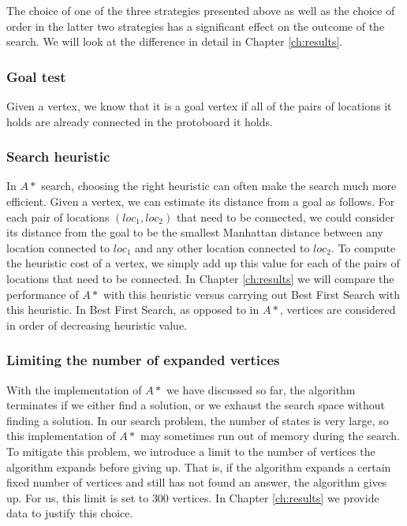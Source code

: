 The choice of one of the three strategies presented above as well as the choice
of order in the latter two strategies has a significant effect on the outcome of
the search. We will look at the difference in detail in Chapter \ref{ch:results}.

\subsubsection{Goal test}

Given a vertex, we know that it is a goal vertex if all of the pairs of
locations it holds are already connected in the protoboard it holds.

\subsubsection{Search heuristic}

In $A*$ search, choosing the right heuristic can often make the search much more
efficient. Given a
vertex, we can estimate its distance from a goal as follows. For each pair of
locations $(loc_1, loc_2)$ that need to be connected, we could consider its
distance from the
goal to be the smallest Manhattan distance between any location connected to
$loc_1$ and any other location connected to $loc_2$. To compute the heuristic
cost of a vertex, we simply add up this value for each of the pairs of locations
that need to be connected. In Chapter \ref{ch:results} we will compare the
performance of $A*$ with this heuristic versus carrying out Best First Search
with this heuristic. In Best First Search, as opposed to in $A*$, vertices are
considered in order of decreasing heuristic value.

\subsubsection{Limiting the number of expanded vertices}

With the implementation of $A*$ we have discussed so far, the algorithm
terminates if we either find a solution, or we
exhaust the search space without finding a solution. In our search problem, the
number of states is very large, so this implementation of $A*$ may sometimes
run out
of memory during the search. To mitigate this problem, we introduce a limit to
the number of vertices the algorithm expands before giving up. That is, if the
algorithm expands a certain fixed number of vertices and still has not found an
answer, the algorithm gives up. For us, this limit is set to $300$ vertices.
In Chapter \ref{ch:results} we provide data to justify this choice.

